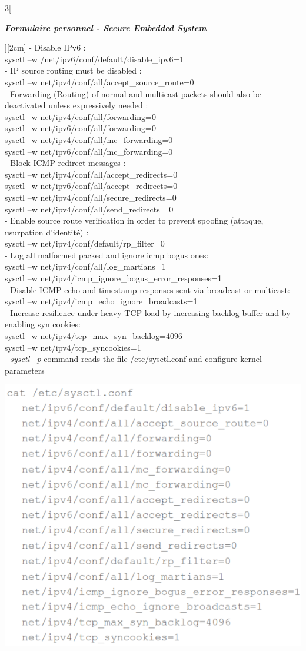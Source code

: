 \begin{multicols}{3}[\centerline{ \large\em \textbf{Formulaire personnel - Secure Embedded System}}][2cm]
- Disable IPv6 :\\
sysctl –w /net/ipv6/conf/default/disable\_ipv6=1\\
- IP source routing must be disabled : \\
sysctl –w net/ipv4/conf/all/accept\_source\_route=0\\
- Forwarding (Routing) of normal and multicast packets should also be deactivated unless expressively needed : \\
sysctl –w net/ipv4/conf/all/forwarding=0\\
sysctl –w net/ipv6/conf/all/forwarding=0\\
sysctl –w net/ipv4/conf/all/mc\_forwarding=0\\
sysctl –w net/ipv6/conf/all/mc\_forwarding=0\\
- Block ICMP redirect messages : \\
sysctl –w net/ipv4/conf/all/accept\_redirects=0\\
sysctl –w net/ipv6/conf/all/accept\_redirects=0\\
sysctl –w net/ipv4/conf/all/secure\_redirects=0\\
sysctl –w net/ipv4/conf/all/send\_redirects =0\\
- Enable source route verification in order to prevent spoofing (attaque, usurpation d'identité) : \\
sysctl –w net/ipv4/conf/default/rp\_filter=0\\
- Log all malformed packed and ignore icmp bogus ones:\\
sysctl –w net/ipv4/conf/all/log\_martians=1\\
sysctl –w net/ipv4/icmp\_ignore\_bogus\_error\_responses=1\\
- Disable ICMP echo and timestamp responses sent via broadcast or multicast:\\
sysctl –w net/ipv4/icmp\_echo\_ignore\_broadcasts=1\\
- Increase resilience under heavy TCP load by increasing backlog buffer and by enabling syn cookies:\\
sysctl –w net/ipv4/tcp\_max\_syn\_backlog=4096\\
sysctl –w net/ipv4/tcp\_syncookies=1\\
- \textit{sysctl –p} command reads the file /etc/sysctl.conf and configure kernel parameters\\
\begin{minipage}{\linewidth}
	\centering
    \includegraphics[width =0.5\columnwidth]{images/18.png}

\end{minipage}
\end{multicols}
